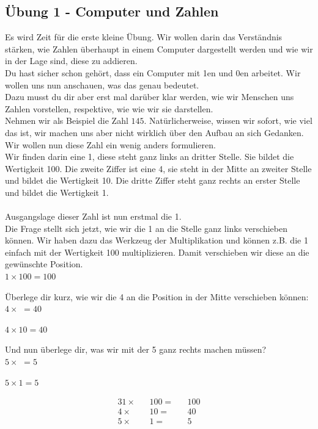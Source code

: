 \subsection{Übung 1 - Computer und Zahlen}
Es wird Zeit für die erste kleine Übung. Wir wollen darin das Verständnis stärken, wie Zahlen überhaupt in einem Computer
dargestellt werden und wie wir in der Lage sind, diese zu addieren.\\
Du hast sicher schon gehört, dass ein Computer mit 1en und 0en arbeitet. Wir wollen uns nun anschauen, was das genau bedeutet.\\
Dazu musst du dir aber erst mal darüber klar werden, wie wir Menschen uns Zahlen vorstellen, respektive, wie wie wir
sie darstellen.\\
Nehmen wir als Beispiel die Zahl $145$.
Natürlicherweise, wissen wir sofort, wie viel das ist, wir machen uns aber nicht
wirklich über den Aufbau an sich Gedanken. Wir wollen nun diese Zahl ein wenig anders formulieren.\\
Wir finden darin eine 1, diese steht ganz links an dritter Stelle. Sie bildet die Wertigkeit 100. Die zweite Ziffer ist eine
4, sie steht in der Mitte an zweiter Stelle und bildet die Wertigkeit 10. Die dritte Ziffer steht ganz rechts an erster Stelle
und bildet die Wertigkeit 1.\\\\
Ausgangslage dieser Zahl ist nun erstmal die 1.\\
Die Frage stellt sich jetzt, wie wir die 1 an die Stelle ganz links verschieben können.
Wir haben dazu das Werkzeug der Multiplikation und können z.B. die 1 einfach mit der Wertigkeit 100 multiplizieren. Damit
verschieben wir diese an die gewünschte Position.\\
$1 \times 100 = 100$\\
\begin{exerciseseries}[columns=1,solsubrule=\hrule]{}
    \begin{exercise}
        Überlege dir kurz, wie wir die 4 an die Position in der Mitte verschieben können:\\
        $4 \times $\underline{\hspace{1cm}} $ = 40$
    \end{exercise}
    \begin{solution}
        $4 \times 10 = 40$
    \end{solution}

    \begin{exercise}
        Und nun überlege dir, was wir mit der 5 ganz rechts machen müssen?\\
        $5 \times $\underline{\hspace{1cm}} $ = 5$
    \end{exercise}
    \begin{solution}
        $5 \times 1 = 5$
    \end{solution}
\end{exerciseseries}

\begin{alignat*}{3}
    1 \times && 100 = && 100\\
    4 \times &&  10 = &&  40\\
    5 \times &&   1 = &&   5
\end{alignat*}

\newpage
\subsection{\solutionsname}
\loadSolutions